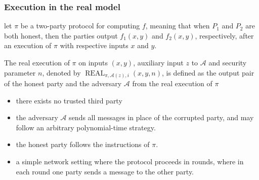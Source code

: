 \documentclass{beamer}
\begin{document}
    \begin{frame}
        \frametitle{Execution in the real model}
        \begin{definition}
            let $\pi$ be a two-party protocol for computing $f$, meaning that when $P_{1}$ and $P_{2}$ are both honest, then the parties output $f_{1}(x, y)$ and $f_{2}(x, y)$, respectively, after an execution of $\pi$ with respective inputs $x$ and $y$. 

            The real execution of $\pi$ on inputs $(x, y)$, auxiliary input $z$ to $\mathcal{A}$ and security parameter $n$, denoted by $\operatorname{REAL}_{\pi, \mathcal{A}(z), i}(x, y, n)$, is defined as the output pair of the honest party and the adversary $\mathcal{A}$ from the real execution of $\pi$
        \end{definition}
        \begin{itemize}
            \item there exists no trusted third party 

            \item the adversary $\mathcal{A}$ sends all messages in place of the corrupted party, and may follow an arbitrary polynomial-time strategy. 
            
            \item the honest party follows the instructions of $\pi .$ 
            
            \item a simple network setting where the protocol proceeds in rounds, where in each round one party sends a message to the other party.
        \end{itemize}
        
    
    \end{frame}
\end{document}
